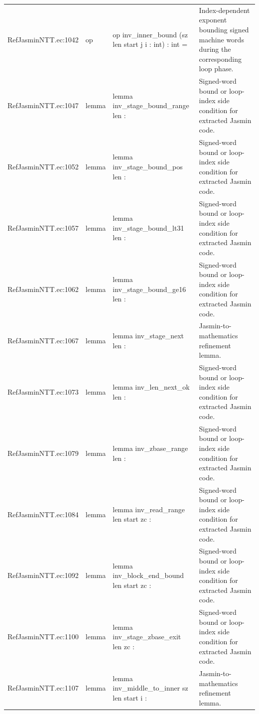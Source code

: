 \documentclass[10pt]{article}
\begin{document}
\begin{longtable}{L{0.11\textwidth}L{0.05\textwidth}L{0.38\textwidth}L{0.42\textwidth}}
RefJasminNTT.\allowbreak{}ec:\allowbreak{}1042 & op & {\ttfamily\scriptsize op inv\_inner\_bound (sz len start j i : int) : int =} & Index-dependent exponent bounding signed machine words during the corresponding loop phase. \\
RefJasminNTT.\allowbreak{}ec:\allowbreak{}1047 & lemma & {\ttfamily\scriptsize lemma inv\_stage\_bound\_range len :} & Signed-word bound or loop-index side condition for extracted Jasmin code. \\
RefJasminNTT.\allowbreak{}ec:\allowbreak{}1052 & lemma & {\ttfamily\scriptsize lemma inv\_stage\_bound\_pos len :} & Signed-word bound or loop-index side condition for extracted Jasmin code. \\
RefJasminNTT.\allowbreak{}ec:\allowbreak{}1057 & lemma & {\ttfamily\scriptsize lemma inv\_stage\_bound\_lt31 len :} & Signed-word bound or loop-index side condition for extracted Jasmin code. \\
RefJasminNTT.\allowbreak{}ec:\allowbreak{}1062 & lemma & {\ttfamily\scriptsize lemma inv\_stage\_bound\_ge16 len :} & Signed-word bound or loop-index side condition for extracted Jasmin code. \\
RefJasminNTT.\allowbreak{}ec:\allowbreak{}1067 & lemma & {\ttfamily\scriptsize lemma inv\_stage\_next len :} & Jasmin-to-mathematics refinement lemma. \\
RefJasminNTT.\allowbreak{}ec:\allowbreak{}1073 & lemma & {\ttfamily\scriptsize lemma inv\_len\_next\_ok len :} & Signed-word bound or loop-index side condition for extracted Jasmin code. \\
RefJasminNTT.\allowbreak{}ec:\allowbreak{}1079 & lemma & {\ttfamily\scriptsize lemma inv\_zbase\_range len :} & Signed-word bound or loop-index side condition for extracted Jasmin code. \\
RefJasminNTT.\allowbreak{}ec:\allowbreak{}1084 & lemma & {\ttfamily\scriptsize lemma inv\_read\_range len start zc :} & Signed-word bound or loop-index side condition for extracted Jasmin code. \\
RefJasminNTT.\allowbreak{}ec:\allowbreak{}1092 & lemma & {\ttfamily\scriptsize lemma inv\_block\_end\_bound len start zc :} & Signed-word bound or loop-index side condition for extracted Jasmin code. \\
RefJasminNTT.\allowbreak{}ec:\allowbreak{}1100 & lemma & {\ttfamily\scriptsize lemma inv\_stage\_zbase\_exit len zc :} & Signed-word bound or loop-index side condition for extracted Jasmin code. \\
RefJasminNTT.\allowbreak{}ec:\allowbreak{}1107 & lemma & {\ttfamily\scriptsize lemma inv\_middle\_to\_inner sz len start i :} & Jasmin-to-mathematics refinement lemma. \\

\end{longtable}
\end{document}
